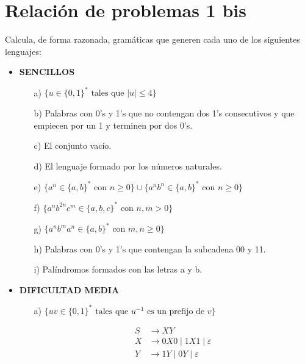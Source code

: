 \documentclass[12pt]{book} %
\begin{document}
\newpage

\hypertarget{relaciuxf3n-de-problemas-1-bis}{%
\section{Relación de problemas 1
bis}\label{relaciuxf3n-de-problemas-1-bis}}

\begin{ejercicio}
Calcula, de forma razonada, gramáticas que generen cada uno de los siguientes lenguajes:

\begin{itemize}
    \item \textbf{SENCILLOS}
    \begin{itemize}
        \item[a)] $\{u \in \{0, 1\}^* \text{ tales que } |u| \leq 4\}$
        \item[b)] Palabras con 0’s y 1’s que no contengan dos 1’s consecutivos y que empiecen por un 1 y terminen por dos 0’s.
        \item[c)] El conjunto vacío.
        \item[d)] El lenguaje formado por los números naturales.
        \item[e)] $\{a^n \in \{a, b\}^* \text{ con } n \geq 0\} \cup \{a^n b^n \in \{a, b\}^* \text{ con } n \geq 0\}$
        \item[f)] $\{a^n b^{2n} c^m \in \{a, b, c\}^* \text{ con } n, m > 0\}$
        \item[g)] $\{a^n b^m a^n \in \{a, b\}^* \text{ con } m, n \geq 0\}$
        \item[h)] Palabras con 0’s y 1’s que contengan la subcadena 00 y 11.
        \item[i)] Palíndromos formados con las letras a y b.
    \end{itemize}

    \item \textbf{DIFICULTAD MEDIA}
    \begin{itemize}
        \item[a)] $\{uv \in \{0, 1\}^* \text{ tales que } u^{-1} \text{ es un prefijo de } v\}$
        \begin{solucion}[media.a]

        \begin{align*}
        S &\rightarrow XY \\
        X &\rightarrow 0X0 \mid 1X1 \mid \varepsilon \\
        Y &\rightarrow 1Y \mid 0Y \mid \varepsilon 
        \end{align*}


\end{solucion}
\end{itemize}
\end{itemize}
\end{ejercicio}
\end{document}
